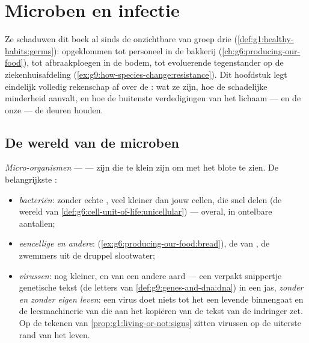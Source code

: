 \chapter{Microben en infectie}\label{ch:g9:microbes-and-infection}

Ze schaduwen dit boek al sinds de onzichtbare  van
groep drie (\cref{def:g1:healthy-habits:germs}): opgeklommen tot
personeel in de bakkerij
(\cref{ch:g6:producing-our-food}), tot afbraakploegen in de bodem,
tot evoluerende tegenstander op de ziekenhuisafdeling
(\cref{ex:g9:how-species-change:resistance}). Dit hoofdstuk legt
eindelijk volledig rekenschap af over de : wat ze zijn, hoe
de schadelijke minderheid aanvalt, en hoe de buitenste
verdedigingen van het lichaam --- en de onze --- de deuren houden.

\section{De wereld van de microben}

\begin{definition}\label{def:g9:microbes-and-infection:sorted}
\emph{Micro-organismen} ---  ---
zijn  die te klein zijn om met het blote  te zien.
De belangrijkste :
\begin{itemize}
  \item \emph{bacteriën}:  zonder
        echte , veel kleiner dan jouw cellen, die snel
        delen (de wereld van
        \cref{def:g6:cell-unit-of-life:unicellular}) --- overal,
        in ontelbare aantallen;
  \item \emph{eencellige  en andere}: 
        (\cref{ex:g6:producing-our-food:bread}), de  van
        , de zwemmers uit de druppel slootwater;
  \item \emph{virussen}: nog kleiner, en van een
        andere aard --- een verpakt snippertje genetische tekst
        (de letters van \cref{def:g9:genes-and-dna:dna}) in een
        jas, \emph{zonder  en zonder eigen leven}: een virus
        doet niets tot het een levende  binnengaat en de
        leesmachinerie van die  aan het kopiëren van de tekst
        van de indringer zet. Op de tekenen van
        \cref{prop:g1:living-or-not:signs} zitten virussen op de
        uiterste rand van het leven.
\end{itemize}
\end{definition}

